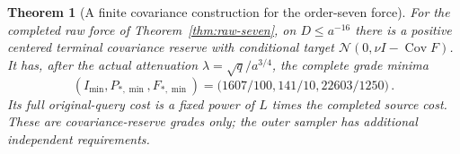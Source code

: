 \documentclass[11pt]{article}
\numberwithin{equation}{section}
\newtheorem{theorem}{Theorem}[section]
\theoremstyle{remark}\newtheorem{remark}[theorem]{Remark}
\newcommand{\N}{\mathcal N}\newcommand{\Cov}{\operatorname{Cov}}
\begin{document}
\begin{theorem}[A finite covariance construction for the order-seven force]
\label{thm:covariance-sixteen}
For the completed raw force of Theorem~\ref{thm:raw-seven}, on
$D\le a^{-16}$ there is a positive centered terminal covariance
reserve with conditional target $\N(0,\nu I-\Cov F)$.
It has, after the actual attenuation $\lambda=\sqrt q/a^{3/4}$,
the complete grade minima
\begin{equation}\label{eq:covariance-grade-minima}
 (I_{\min},P_{*,\min},F_{*,\min})
 =\bigl(1607/100,141/10,22603/1250\bigr)\,.
\end{equation}
Its full original-query cost is a fixed power of $L$ times the
completed source cost. These are covariance-reserve grades only;
the outer sampler has additional independent requirements.
\end{theorem}
\end{document}
